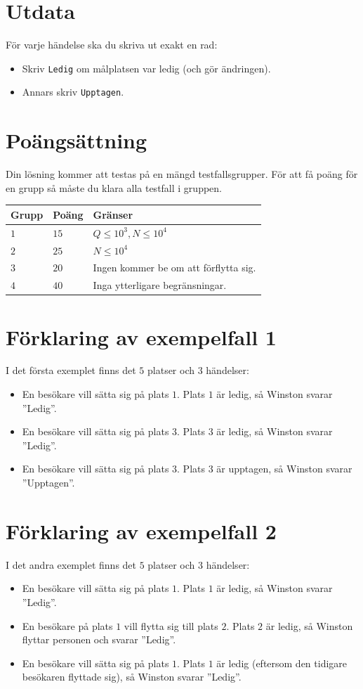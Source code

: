\section*{Utdata}
För varje händelse ska du skriva ut exakt en rad:
\begin{itemize}
  \item Skriv \verb|Ledig| om målplatsen var ledig (och gör ändringen).
  \item Annars skriv \verb|Upptagen|.
\end{itemize}

\section*{Poängsättning}
Din lösning kommer att testas på en mängd testfallsgrupper.
För att få poäng för en grupp så måste du klara alla testfall i gruppen.

\noindent
\begin{tabular}{| l | l | p{12cm} |}
  \hline
  \textbf{Grupp} & \textbf{Poäng} & \textbf{Gränser} \\ \hline
  $1$    & $15$  & $Q \le 10^3, N \le 10^4$ \\ \hline
  $2$    & $25$  & $N \le 10^4$ \\ \hline
  $3$    & $20$  & Ingen kommer be om att förflytta sig. \\ \hline
  $4$    & $40$  & Inga ytterligare begränsningar. \\ \hline
\end{tabular}

\section*{Förklaring av exempelfall 1}

I det första exemplet finns det $5$ platser och $3$ händelser:
\begin{itemize}
  \item En besökare vill sätta sig på plats $1$. Plats $1$ är ledig, så Winston svarar ''Ledig''.
  \item En besökare vill sätta sig på plats $3$. Plats $3$ är ledig, så Winston svarar ''Ledig''.
  \item En besökare vill sätta sig på plats $3$. Plats $3$ är upptagen, så Winston svarar ''Upptagen''.
\end{itemize}

\section*{Förklaring av exempelfall 2}  
I det andra exemplet finns det $5$ platser och $3$ händelser:
\begin{itemize}
  \item En besökare vill sätta sig på plats $1$. Plats $1$ är ledig, så Winston svarar ''Ledig''.
  \item En besökare på plats $1$ vill flytta sig till plats $2$. Plats $2$ är ledig, så Winston flyttar personen och svarar ''Ledig''.
  \item En besökare vill sätta sig på plats $1$. Plats $1$ är ledig (eftersom den tidigare besökaren flyttade sig), så Winston svarar ''Ledig''.
\end{itemize} 

